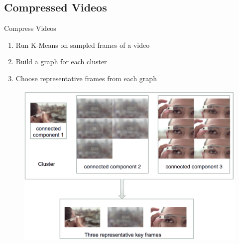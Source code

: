 \subsection{Compressed Videos}
\begin{frame}{Compress Videos}

	\begin{enumerate}
		\item Run K-Means on sampled frames of a video
		\item Build a graph for each cluster
		\item Choose representative frames from each graph
	\end{enumerate}

			\begin{figure}[!ht]
				\centering
				\includegraphics[scale=0.32]{./keyFrames.png}
			\end{figure}
\end{frame}

